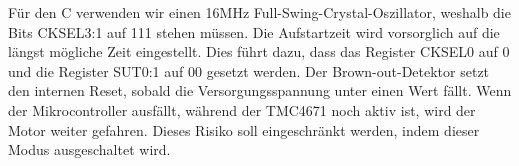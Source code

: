 %
Für den \textmu C verwenden wir einen 16MHz Full-Swing-Crystal-Oszillator, weshalb die Bits CKSEL3:1 auf 111 stehen müssen.
Die Aufstartzeit wird vorsorglich auf die längst mögliche Zeit eingestellt. Dies führt dazu, dass das Register CKSEL0 auf 0 und die Register SUT0:1 auf 00 gesetzt werden.
%
%
%
%
%
%
%
%
%
%
%
%
Der Brown-out-Detektor setzt den internen Reset, sobald die Versorgungsspannung unter einen Wert fällt. Wenn der Mikrocontroller ausfällt, während der TMC4671 noch aktiv ist, wird der Motor weiter gefahren. Dieses Risiko soll eingeschränkt werden, indem dieser Modus ausgeschaltet wird.

